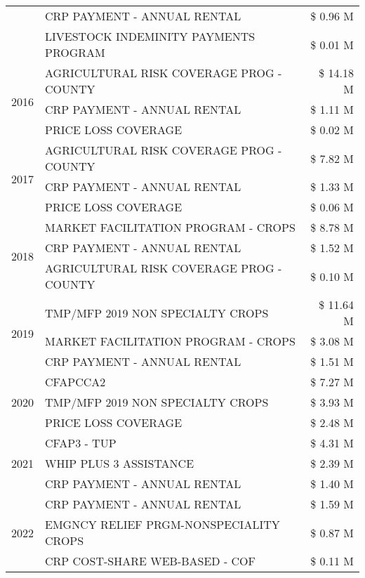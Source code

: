 \begin{tabular}{llr}
 & CRP PAYMENT - ANNUAL RENTAL & \$ 0.96 M \\
 & LIVESTOCK INDEMINITY PAYMENTS PROGRAM & \$ 0.01 M \\
\cline{1-3}
\multirow[t]{3}{*}{2016} & AGRICULTURAL RISK COVERAGE PROG - COUNTY & \$ 14.18 M \\
 & CRP PAYMENT - ANNUAL RENTAL & \$ 1.11 M \\
 & PRICE LOSS COVERAGE & \$ 0.02 M \\
\cline{1-3}
\multirow[t]{3}{*}{2017} & AGRICULTURAL RISK COVERAGE PROG - COUNTY & \$ 7.82 M \\
 & CRP PAYMENT - ANNUAL RENTAL & \$ 1.33 M \\
 & PRICE LOSS COVERAGE & \$ 0.06 M \\
\cline{1-3}
\multirow[t]{3}{*}{2018} & MARKET FACILITATION PROGRAM - CROPS & \$ 8.78 M \\
 & CRP PAYMENT - ANNUAL RENTAL & \$ 1.52 M \\
 & AGRICULTURAL RISK COVERAGE PROG - COUNTY & \$ 0.10 M \\
\cline{1-3}
\multirow[t]{3}{*}{2019} & TMP/MFP 2019 NON SPECIALTY CROPS & \$ 11.64 M \\
 & MARKET FACILITATION PROGRAM - CROPS & \$ 3.08 M \\
 & CRP PAYMENT - ANNUAL RENTAL & \$ 1.51 M \\
\cline{1-3}
\multirow[t]{3}{*}{2020} & CFAPCCA2 & \$ 7.27 M \\
 & TMP/MFP 2019 NON SPECIALTY CROPS & \$ 3.93 M \\
 & PRICE LOSS COVERAGE & \$ 2.48 M \\
\cline{1-3}
\multirow[t]{3}{*}{2021} & CFAP3 - TUP & \$ 4.31 M \\
 & WHIP PLUS 3 ASSISTANCE & \$ 2.39 M \\
 & CRP PAYMENT - ANNUAL RENTAL & \$ 1.40 M \\
\cline{1-3}
\multirow[t]{3}{*}{2022} & CRP PAYMENT - ANNUAL RENTAL & \$ 1.59 M \\
 & EMGNCY RELIEF PRGM-NONSPECIALITY CROPS & \$ 0.87 M \\
 & CRP COST-SHARE WEB-BASED - COF & \$ 0.11 M \\
\cline{1-3}
\bottomrule
\end{tabular}
